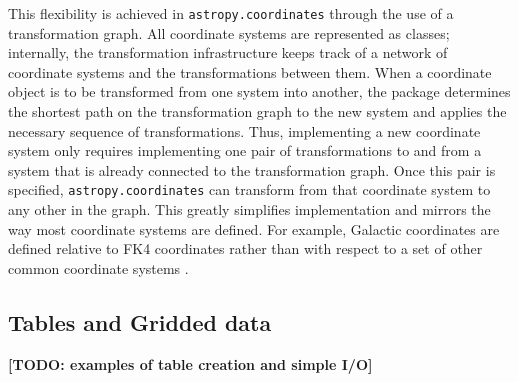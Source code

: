 \documentclass[traditabstract]{aa}
\begin{document}
This flexibility is achieved in \texttt{astropy.coordinates} through the use
of a transformation graph. All coordinate systems are represented as classes;
internally, the transformation infrastructure keeps track of a network of
coordinate systems and the transformations between them. When a coordinate
object is to be transformed from one system into another, the package
determines the shortest path on the transformation graph to the new system and
applies the necessary sequence of transformations. Thus, implementing a new
coordinate system only requires implementing one pair of transformations to
and from a system that is already connected to the transformation graph. Once
this pair is specified, \texttt{astropy.coordinates} can transform from that
coordinate system to any other in the graph. This greatly simplifies
implementation and mirrors the way most coordinate systems are defined. For
example, Galactic coordinates are defined relative to FK4 coordinates rather
than with respect to a set of other common coordinate systems
\citep{galcoords, reid04}.








%

\subsection{Tables and Gridded data}


\label{sec:table}

\textbf{[TODO: examples of table creation and simple I/O]}\\
\end{document}
